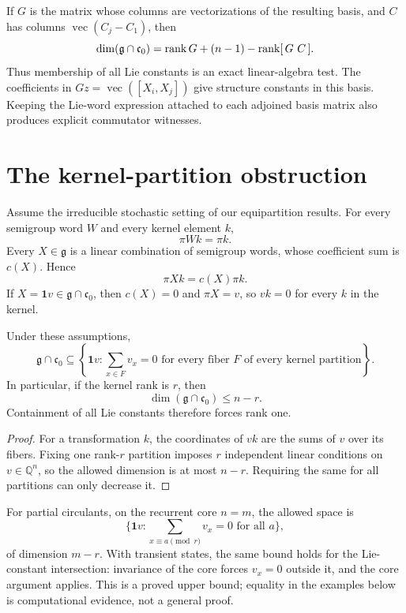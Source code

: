 If $G$ is the matrix whose columns are vectorizations of the resulting
basis, and $C$ has columns $\operatorname{vec}(C_j-C_1)$, then
\[
 \dim(\mathfrak g\cap\mathfrak c_0)
 =\operatorname{rank} G+(n-1)-\operatorname{rank}[\,G\ C\,].
\]
Thus membership of all Lie constants is an exact linear-algebra test.
The coefficients in $Gz=\operatorname{vec}([X_i,X_j])$ give structure
constants in this basis. Keeping the Lie-word expression attached to each
adjoined basis matrix also produces explicit commutator witnesses.

\section{The kernel-partition obstruction}
Assume the irreducible stochastic setting of our equipartition results.
For every semigroup word $W$ and every kernel element $k$,
\[
 \pi Wk=\pi k.
\]
Every $X\in\mathfrak g$ is a linear combination of semigroup words, whose
coefficient sum is $c(X)$. Hence
\[
 \pi Xk=c(X)\pi k.
\]
If $X=\mathbf{1} v\in\mathfrak g\cap\mathfrak c_0$, then $c(X)=0$ and
$\pi X=v$, so $vk=0$ for every $k$ in the kernel.

\begin{proposition}
Under these assumptions,
\[
 \mathfrak g\cap\mathfrak c_0
 \subseteq
 \left\{\mathbf{1} v:\sum_{x\in F}v_x=0
 \text{ for every fiber }F\text{ of every kernel partition}\right\}.
\]
In particular, if the kernel rank is $r$, then
\[
 \dim(\mathfrak g\cap\mathfrak c_0)\le n-r.
\]
Containment of all Lie constants therefore forces rank one.
\end{proposition}
\begin{proof}
For a transformation $k$, the coordinates of $vk$ are the sums of $v$
over its fibers. Fixing one rank-$r$ partition imposes $r$ independent
linear conditions on $v\in\mathbb Q^n$, so the allowed dimension is at
most $n-r$. Requiring the same for all partitions can only decrease it.
\end{proof}

For partial circulants, on the recurrent core $n=m$, the allowed space is
\[
 \{\mathbf{1} v:\sum_{x\equiv a\pmod r}v_x=0\text{ for all }a\},
\]
of dimension $m-r$. With transient states, the same bound holds for the
Lie-constant intersection: invariance of the core forces $v_x=0$ outside
it, and the core argument applies. This is a proved upper bound; equality
in the examples below is computational evidence, not a general proof.

